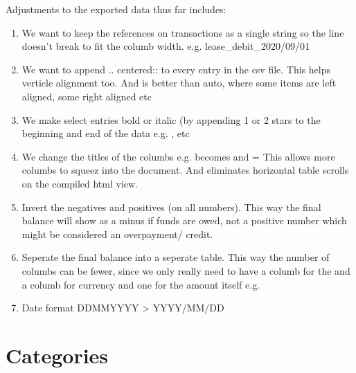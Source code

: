 \documentclass[letterpaper,10pt,openany,oneside,english]{sphinxmanual}
\begin{document}
\sphinxAtStartPar
Adjustments to the exported data thus far includes:
\begin{enumerate}
%
\item {} 
\sphinxAtStartPar
We want to keep the references on transactions as a single string so the line doesn’t break to fit the columb width. e.g. lease\_debit\_2020/09/01

\item {} 
\sphinxAtStartPar
We want to append {\color{red}\bfseries{}\textasciigrave{}}.. centered:: \textasciigrave{} to every entry in the csv file. This helps verticle alignment too. And is better than auto, where some items are left aligned, some right aligned etc

\item {} 
\sphinxAtStartPar
We make select entries bold or italic (by appending 1 or 2 stars to the beginning and end of the data e.g. ,  etc

\item {} 
\sphinxAtStartPar
We change the titles of the columbs e.g.  becomes  and  =  \sphinxhyphen{} This allows more columbs to squeez into the document. And eliminates horizontal table scrolls on the compiled html view.

\item {} 
\sphinxAtStartPar
Invert the negatives and positives (on all numbers). This way the final balance will show as a minus if funds are owed, not a positive number which might be considered an overpayment/ credit.

\item {} 
\sphinxAtStartPar
Seperate the final balance into a seperate table. This way the number of columbs can be fewer, since we only really need to have a columb for the  and a columb for currency  and one for the amount itself e.g. 

\item {} 
\sphinxAtStartPar
Date format DD\sphinxhyphen{}MM\sphinxhyphen{}YYYY \textgreater{} YYYY/MM/DD

\end{enumerate}


\chapter{Categories}
\label{\detokenize{categories:categories}}\label{\detokenize{categories::doc}}
\end{document}
